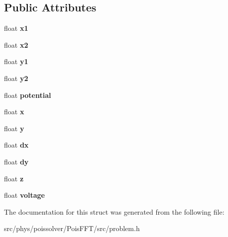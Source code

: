 \subsection*{Public Attributes}
\begin{DoxyCompactItemize}
\item 
float {\bfseries x1}\hypertarget{structphys_1_1Problem_1_1Electrode_a29c038f2a1654f43712ae07a7fa99522}{}\label{structphys_1_1Problem_1_1Electrode_a29c038f2a1654f43712ae07a7fa99522}

\item 
float {\bfseries x2}\hypertarget{structphys_1_1Problem_1_1Electrode_a6471c460133fb63720173342829f38dd}{}\label{structphys_1_1Problem_1_1Electrode_a6471c460133fb63720173342829f38dd}

\item 
float {\bfseries y1}\hypertarget{structphys_1_1Problem_1_1Electrode_aa953c5e5b0d0d585843713b9899002d5}{}\label{structphys_1_1Problem_1_1Electrode_aa953c5e5b0d0d585843713b9899002d5}

\item 
float {\bfseries y2}\hypertarget{structphys_1_1Problem_1_1Electrode_ae781ccf15319ec8cc9826a2e9e0c1bfa}{}\label{structphys_1_1Problem_1_1Electrode_ae781ccf15319ec8cc9826a2e9e0c1bfa}

\item 
float {\bfseries potential}\hypertarget{structphys_1_1Problem_1_1Electrode_ad73abd51340491bb2d411de7c7d74fa3}{}\label{structphys_1_1Problem_1_1Electrode_ad73abd51340491bb2d411de7c7d74fa3}

\item 
float {\bfseries x}\hypertarget{structphys_1_1Problem_1_1Electrode_ae2e5c5012fddd20f5384fdf80bab2deb}{}\label{structphys_1_1Problem_1_1Electrode_ae2e5c5012fddd20f5384fdf80bab2deb}

\item 
float {\bfseries y}\hypertarget{structphys_1_1Problem_1_1Electrode_a1b309a1a280f0ce2b63c795479e7e09e}{}\label{structphys_1_1Problem_1_1Electrode_a1b309a1a280f0ce2b63c795479e7e09e}

\item 
float {\bfseries dx}\hypertarget{structphys_1_1Problem_1_1Electrode_ac90f645c9079706163a7396f9874800f}{}\label{structphys_1_1Problem_1_1Electrode_ac90f645c9079706163a7396f9874800f}

\item 
float {\bfseries dy}\hypertarget{structphys_1_1Problem_1_1Electrode_aaf6a506291a9a32c4398531e122b6b67}{}\label{structphys_1_1Problem_1_1Electrode_aaf6a506291a9a32c4398531e122b6b67}

\item 
float {\bfseries z}\hypertarget{structphys_1_1Problem_1_1Electrode_a65823a45c517abb996209ae6a272ab45}{}\label{structphys_1_1Problem_1_1Electrode_a65823a45c517abb996209ae6a272ab45}

\item 
float {\bfseries voltage}\hypertarget{structphys_1_1Problem_1_1Electrode_af4b9ac4bc77b321b428a4c3ca7c4163c}{}\label{structphys_1_1Problem_1_1Electrode_af4b9ac4bc77b321b428a4c3ca7c4163c}

\end{DoxyCompactItemize}


The documentation for this struct was generated from the following file\+:\begin{DoxyCompactItemize}
\item 
src/phys/poissolver/\+Pois\+F\+F\+T/src/problem.\+h\end{DoxyCompactItemize}

